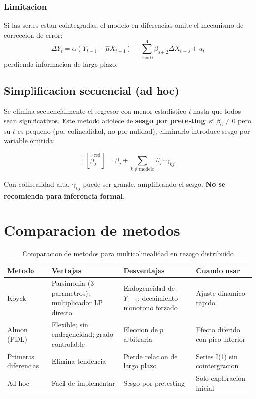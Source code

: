 \documentclass[12pt, letterpaper]{article}
\theoremstyle{remark}
\newcommand{\E}{\mathbb{E}}
\begin{document}
\subsubsection{Limitacion}

Si las series estan cointegradas, el modelo en diferencias omite el
mecanismo de correccion de error:
\begin{equation}
  \Delta Y_t = \alpha(Y_{t-1} - \hat\mu X_{t-1})
               + \sum_{s=0}^{4}\beta_{s+2}\Delta X_{t-s} + u_t
  \label{eq:mce}
\end{equation}
perdiendo informacion de largo plazo.

\subsection{Simplificacion secuencial (ad hoc)}

Se elimina secuencialmente el regresor con menor estadistico $t$ hasta que
todos sean significativos. Este metodo adolece de \textbf{sesgo por pretesting}:
si $\beta_6 \neq 0$ pero su $t$ es pequeno (por colinealidad, no por nulidad),
eliminarlo introduce sesgo por variable omitida:

\begin{equation}
  \E[\hat\beta_j^{\text{red}}]
    = \beta_j + \sum_{k \notin \text{modelo}} \beta_k \cdot \gamma_{kj}
  \label{eq:sesgo_omision}
\end{equation}

Con colinealidad alta, $\gamma_{kj}$ puede ser grande, amplificando el sesgo.
\textbf{No se recomienda para inferencia formal.}

\section{Comparacion de metodos}

\begin{table}[ht]
\centering
\caption{Comparacion de metodos para multicolinealidad en rezago distribuido}
\label{tab:comparacion}
\small
\begin{tabular}{p{2.4cm}p{3.8cm}p{3.8cm}p{2.6cm}}
\toprule
\textbf{Metodo} & \textbf{Ventajas} & \textbf{Desventajas} & \textbf{Cuando usar} \\
\midrule
Koyck &
Parsimonia (3 parametros); multiplicador LP directo &
Endogeneidad de $Y_{t-1}$; decaimiento monotono forzado &
Ajuste dinamico rapido \\
\midrule
Almon (PDL) &
Flexible; sin endogeneidad; grado controlable &
Eleccion de $p$ arbitraria &
Efecto diferido con pico interior \\
\midrule
Primeras diferencias &
Elimina tendencia &
Pierde relacion de largo plazo &
Series I(1) sin cointergracion \\
\midrule
Ad hoc &
Facil de implementar &
Sesgo por pretesting &
Solo exploracion inicial \\
\bottomrule
\end{tabular}
\end{table}
\end{document}
